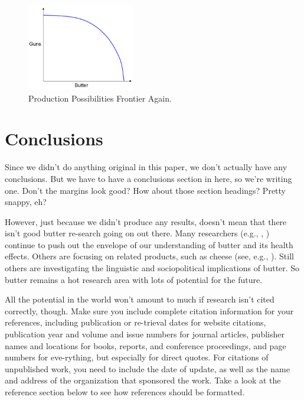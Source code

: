 \documentclass[opre,nonblindrev]{informs3} %
\begin{document}
\begin{figure}[t]
\begin{center}
\includegraphics[height=1.5in]{Sample-Figure}
\caption{Production Possibilities Frontier Again.} \label{ECfrontier}
\end{center}
\end{figure}



\section{Conclusions}

Since we didn't do anything original in this paper, we don't
actually have any conclusions.  But we have to have a conclusions
section in here, so we're writing one.  Don't the margins look good?
How about those section headings?  Pretty snappy, eh?

However, just because we didn't produce any results, doesn't mean
that there isn't good butter re-search going on out there.  Many
researchers
(e.g., \citealt{trbn}, \citealt{h})
continue to push out the envelope of our understanding of butter and
its health effects.  Others are focusing on related products, such as cheese
(see, e.g., \citealt{fo}).
Still others are
investigating the linguistic
\citep{fs}
and sociopolitical
\citep{g}
implications of butter.  So butter
remains a hot research area with lots of potential for the future.

All the potential in the world won't amount to much if research
isn't cited correctly, though. Make sure you include complete
citation information for your references, including publication or
re-trieval dates for website citations, publication year and volume
and issue numbers for journal articles, publisher names and
locations for books, reports, and conference proceedings, and page
numbers for eve-rything, but especially for direct quotes. For
citations of unpublished work, you need to include the date of
update, as well as the name and address of the organization that
sponsored the work. Take a look at the reference section below to
see how references should be formatted.
\end{document}
